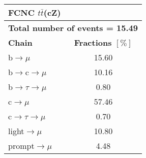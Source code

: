 \begin{tabular}{|l|c|}          
	\hline          
	\multicolumn{2}{|l|}{\textbf{FCNC $t\bar{t}$(cZ)}}    \\        
	\hline          
	\multicolumn{2}{|l|}{\textbf{Total number of events = 15.49}}    \\
	\hline
	\textbf{Chain}        									 & \textbf{Fractions $[\%]$} \\                          
	\hline          
	b$\rightarrow \mu$                 					&   15.60  \\          
	b$\rightarrow$c$\rightarrow \mu$     	&    10.16   \\          
	b$\rightarrow \tau \rightarrow \mu$  	&    0.80 \\          
	c$\rightarrow \mu$                 				 &    57.46\\          
	c$\rightarrow \tau \rightarrow \mu$  	&     0.70 \\          
	light$\rightarrow \mu$              			&    10.80  \\          
	prompt$\rightarrow \mu$                	 	&   4.48 \\            
	\hline    
\end{tabular}    
